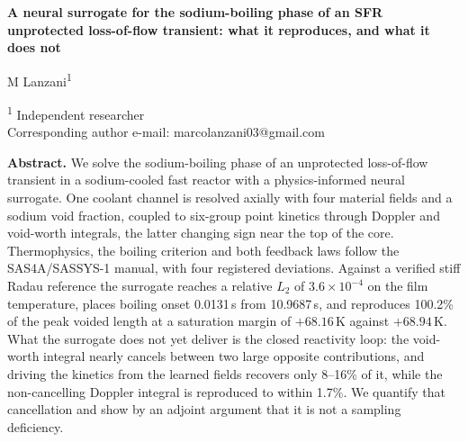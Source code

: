 \documentclass[11pt,a4paper]{article}
\begin{document}
\vspace*{28mm}    %

\begingroup
\raggedright
\fontsize{17}{20}\selectfont\bfseries
A neural surrogate for the sodium-boiling phase of an SFR unprotected loss-of-flow
transient: what it reproduces, and what it does not
\par
\endgroup

\vspace{10mm}

\begingroup
\raggedright \leftskip=25mm
M Lanzani\textsuperscript{1}
\par
\vspace{0.6em}
\fontsize{10}{12}\selectfont
\textsuperscript{1} Independent researcher\\
Corresponding author e-mail: marcolanzani03@gmail.com
\par
\endgroup

\vspace{1.2em}

\begingroup
\leftskip=25mm
\fontsize{10}{12}\selectfont
\noindent\textbf{Abstract.}
We solve the sodium-boiling phase of an unprotected loss-of-flow transient in a
sodium-cooled fast reactor with a physics-informed neural surrogate. One coolant channel is
resolved axially with four material fields and a sodium void fraction, coupled to six-group
point kinetics through Doppler and void-worth integrals, the latter changing sign near the
top of the core. Thermophysics, the boiling criterion and both feedback laws follow the
SAS4A/SASSYS-1 manual, with four registered deviations. Against a verified stiff Radau
reference the surrogate reaches a relative $L_2$ of $3.6\times10^{-4}$ on the film
temperature, places boiling onset 0.0131\,s from 10.9687\,s, and reproduces 100.2\% of the
peak voided length at a saturation margin of $+68.16$\,K against $+68.94$\,K. What the surrogate does not
yet deliver is the closed reactivity loop: the void-worth integral nearly cancels between
two large opposite contributions, and driving the kinetics from the learned fields recovers
only 8--16\% of it, while the non-cancelling Doppler integral is reproduced to within
1.7\%. We quantify that cancellation and show by an adjoint argument that it is not a
sampling deficiency.
\par
\endgroup
\end{document}
